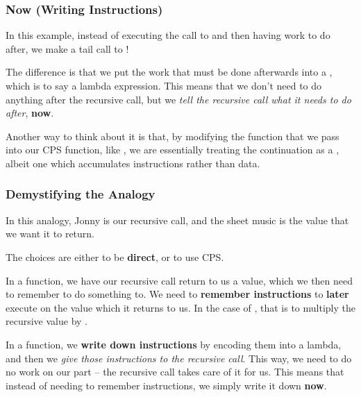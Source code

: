 \documentclass[aspectratio=169]{beamer}
\begin{document}
\begin{frame}[fragile]
  \frametitle{Now (Writing Instructions)}

  In this example, instead of executing the call to 
  and then having work to do after, we make a tail call to !

  \pause
  \vspace{\fill}

  The difference is that we put the work that must be done afterwards
  into a , which is to say a lambda expression. This
  means that we don't need to do anything after the recursive call, but
  we \textit{tell the recursive call what it needs to do after}, \textbf{now}.

  \pause
  \vspace{\fill}

  Another way to think about it is that, by modifying the function that
  we pass into our CPS function, like , we are essentially
  treating the continuation as a , albeit
  one which accumulates instructions rather than data.
\end{frame}

\begin{frame}[fragile]
  \frametitle{Demystifying the Analogy}

  In this analogy, Jonny is our recursive call, and the sheet music is the
  value that we want it to return.

  \pause
  \vspace{\fill}

  The choices are either to be \textbf{direct}, or to use CPS.

  \pause
  \vspace{\fill}

  In a  function, we have our recursive call return to us a value,
  which we then need to remember to do something to. We need to \textbf{remember
  instructions} to \textbf{later} execute on the value which it returns to us.
  In the case of , that is to multiply the recursive value by .

  \pause
  \vspace{\fill}

  In a  function, we \textbf{write down instructions} by encoding them into
  a lambda, and then we \textit{give those instructions to the recursive call}.
  This way, we need to do no work on our part -- the recursive call takes care
  of it for us. This means that instead of needing to remember instructions,
  we simply write it down \textbf{now}.
\end{frame}
\end{document}
